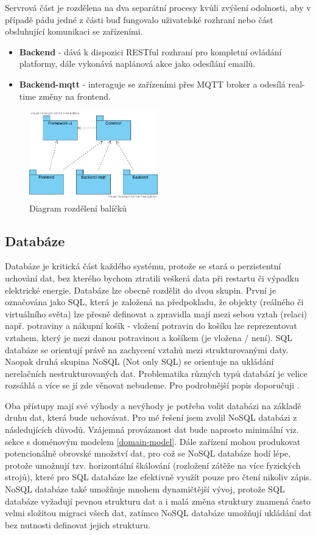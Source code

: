 Servrová část je rozdělena na dva separátní procesy kvůli zvýšení odolnosti, aby v případě pádu jedné z části buď fungovalo uživatelské rozhraní nebo část obsluhující komunikaci se zařízeními.
\begin{itemize}
    \item \textbf{Backend} - dává k dispozici RESTful rozhraní pro kompletní ovládání platformy, dále vykonává naplánová akce jako odesílání emailů.
    \item \textbf{Backend-mqtt} - interaguje se zařízeními přes MQTT broker a odesílá real-time změny na frontend.
\end{itemize}

\begin{figure}[htbp]
    \label{packages-uml}
    \centering
    \includegraphics[width=0.5\textwidth]{img/packages.pdf}
    \caption{Diagram rozdělení balíčků}
\end{figure}

\subsection{Databáze}
Databáze je kritická část každého systému, protože se stará o perzistentní uchování dat, bez kterého bychom ztratili veškerá data při restartu či výpadku elektrické energie. Databáze lze obecně rozdělit do dvou skupin. První je označována jako SQL, která je založená na předpokladu, že objekty (reálného či virtuálního světa) lze přesně definovat a zpravidla mají mezi sebou vztah (relaci) např. potraviny a nákupní košík - vložení potravin do košíku lze reprezentovat vztahem, který je mezi danou potravinou a košíkem (je vložena / není). SQL databáze se orientují právě na zachycení vztahů mezi strukturovanými daty. Naopak druhá skupina NoSQL (Not only SQL) se orientuje na ukládání nerelačních nestrukturovaných dat. Problematika různých typů databází je velice rozsáhlá a více se jí zde věnovat nebudeme. Pro podrobnější popis doporučuji \cite{sql-and-nosql}.

Oba přístupy mají své výhody a nevýhody je potřeba volit databázi na základě druhu dat, která bude uchovávat. Pro mé řešení jsem zvolil NoSQL databázi z následujících důvodů. Vzájemná provázanost dat bude naprosto minimální viz. sekce s doménovým modelem \ref{domain-model}. Dále zařízení mohou produkovat potencionálně obrovské množství dat, pro což se NoSQL databáze hodí lépe, protože umožnují tzv. horizontální škálování (rozložení zátěže na více fyzických strojů), které pro SQL databáze lze efektivně využít pouze pro čtení nikoliv zápis. NoSQL databáze také umožňuje mnohem dynamičtější vývoj, protože SQL databáze vyžadují pevnou strukturu dat a i malá změna struktury znamená často velmi složitou migraci všech dat, zatímco NoSQL databáze umožňují ukládání dat bez nutnosti definovat jejich strukturu.

